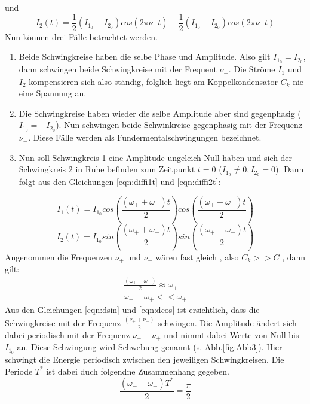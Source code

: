 und
\begin{equation}
  I_2 (t) = \frac{1}{2}(I_{1_{0}} + I_{2_{0}}) cos(2 \pi \nu_+ t) - \frac{1}{2}(I_{1_{0}} - I_{2_{0}})cos(2 \pi \nu_- t)
\label{eqn:diffi2t}
\end{equation}
Nun können drei Fälle betrachtet werden.
\begin{enumerate}
  \item Beide Schwingkreise haben die selbe Phase und Amplitude. Also gilt $I_{1_{0}}= I_{2_{0}}$, dann schwingen beide Schwingkreise mit der Frequent $\nu_+$.
  Die Ströme $I_1$ und $I_2$ kompensieren sich also ständig, folglich liegt am Koppelkondensator $C_k$ nie eine Spannung an.
  \item Die Schwingkreise haben wieder die selbe Amplitude aber sind gegenphasig ($I_{1_{0}}= - I_{2_{0}}$). Nun schwingen beide Schwinkreise gegenphasig mit der Frequenz $\nu_-$.
   Diese Fälle werden als Fundermentalschwingungen bezeichnet.
  \item Nun soll Schwingkreis 1 eine Amplitude ungeleich Null haben und sich der Schwingkreis 2 in Ruhe befinden zum Zeitpunkt $t= 0$ ($I_{1_{0}}\neq 0 , I_{2_{0}}= 0$).
  Dann folgt aus den Gleichungen \eqref{eqn:diffi1t} und \eqref{eqn:diffi2t}:
\end{enumerate}
  \begin{equation}
    I_1 (t) = I_{1_0} cos \left( \frac{(\omega_+ + \omega_-)t}{2}\right) cos \left( \frac{(\omega_+ - \omega_-)t}{2}\right)
  \label{eqn:dcos}
  \end{equation}
  \begin{equation}
    I_2 (t) = I_{1_0} sin \left( \frac{(\omega_+ + \omega_-)t}{2}\right) sin \left( \frac{(\omega_+ - \omega_-)t}{2}\right)
  \label{eqn:dsin}
  \end{equation}
  Angenommen die Frequenzen $ \nu_+$ und $ \nu_-$ wären fast gleich , also $ C_k >> C $ , dann gilt:
  \begin{align}
    \frac{\left(\omega_+ + \omega_- \right)}{2} \approx \omega_+ \\
     \omega_- - \omega_+  << \omega_+
  \end{align}
  Aus den Gleichungen \eqref{eqn:dsin} und \eqref{eqn:dcos} ist ersichtlich, dass die Schwingkreise mit der Frequenz $\frac{(\nu_+ + \nu_-)}{2}$ schwingen. Die Amplitude ändert sich
  dabei periodisch mit der Frequenz $ \nu_- - \nu_+$ und nimmt dabei Werte von Null bis $ I_{1_0}$ an. Diese Schwingung wird Schwebung genannt (s. Abb.\ref{fig:Abb3}). Hier schwingt die Energie periodisch zwischen
  den jeweiligen Schwingkreisen. Die Periode $T^*$ ist dabei duch folgendne Zusammenhang gegeben.
  \begin{equation}
      \frac{(\omega_- - \omega_+)T^*}{2} = \frac{\pi}{2}
  \end{equation}

